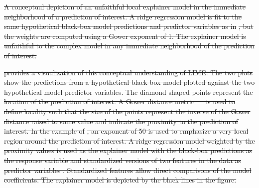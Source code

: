 \documentclass[AMS,STIX2COL]{WileyNJD-v2}\usepackage[]{graphicx}\usepackage[]{color}
\newenvironment{knitrout}{}{} %
\providecommand{\DIFdel}[1]{{\protect\color{red}\sout{#1}}}                      %
\providecommand{\DIFdelFL}[1]{\DIFdel{#1}} %
\begin{document}




{%
\DIFdelFL{A conceptual depiction of an unfaithful local explainer model in the immediate neighborhood of a prediction of interest. A ridge regression model is fit to the same hypothetical black-box model predictions and predictor variables as in }%
\DIFdelFL{, but the weights are computed using a Gower exponent of 1. The explainer model is unfaithful to the complex model in any immediate neighborhood of the prediction of interest.}}

\DIFdel{provides a visualization of this conceptual understanding of LIME. The two plots show the predictions from a hypothetical black-box model plotted against the two hypothetical model predictor variables. The diamond shaped points represent the location of the prediction of interest. A Gower distance metric \mbox{%
\citep{gower:1971} }\hspace{0pt}%
is used to define locality such that the size of the points represent the inverse of the Gower distance raised to some value and indicate the proximity to the prediction of interest. In the example of }%
\DIFdel{, an exponent of 50 is used to emphasize a very local region around the prediction of interest. A ridge regression model weighted by the proximity values is used as the explainer model with the black-box predictions as the response variable and standardized versions of two features in the data as predictor variables . Standardized features allow direct comparisons of the model coefficients. The explainer model is depicted by the black lines in the figure.
}%
\end{document}
